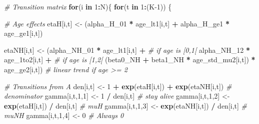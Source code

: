 \documentclass[
  12pt,
]{krantz}
\newenvironment{Shaded}{\begin{snugshade}}{\end{snugshade}}
\newcommand{\CommentTok}[1]{\textcolor[rgb]{0.56,0.35,0.01}{\textit{#1}}}
\newcommand{\ControlFlowTok}[1]{\textcolor[rgb]{0.13,0.29,0.53}{\textbf{#1}}}
\newcommand{\DecValTok}[1]{\textcolor[rgb]{0.00,0.00,0.81}{#1}}
\newcommand{\FunctionTok}[1]{\textcolor[rgb]{0.13,0.29,0.53}{\textbf{#1}}}
\newcommand{\NormalTok}[1]{#1}
\newcommand{\OtherTok}[1]{\textcolor[rgb]{0.56,0.35,0.01}{#1}}
\newcommand{\SpecialCharTok}[1]{\textcolor[rgb]{0.81,0.36,0.00}{\textbf{#1}}}
\begin{document}
\begin{Shaded}
\begin{Highlighting}[]
\CommentTok{\# Transition matrix}
  \ControlFlowTok{for}\NormalTok{(i }\ControlFlowTok{in} \DecValTok{1}\SpecialCharTok{:}\NormalTok{N)\{}
    \ControlFlowTok{for}\NormalTok{(t }\ControlFlowTok{in} \DecValTok{1}\SpecialCharTok{:}\NormalTok{(K}\DecValTok{{-}1}\NormalTok{)) \{}
      
      \CommentTok{\# Age effects}
\NormalTok{      etaH[i,t] }\OtherTok{\textless{}{-}}\NormalTok{ (alpha\_H\_01 }\SpecialCharTok{*}\NormalTok{ age\_lt1[i,t] }\SpecialCharTok{+}\NormalTok{ alpha\_H\_ge1 }\SpecialCharTok{*}\NormalTok{ age\_ge1[i,t])}
      
\NormalTok{      etaNH[i,t] }\OtherTok{\textless{}{-}}\NormalTok{ (alpha\_NH\_01 }\SpecialCharTok{*}\NormalTok{ age\_lt1[i,t] }\SpecialCharTok{+}                               \CommentTok{\# if age is [0,1[}
\NormalTok{                       alpha\_NH\_12 }\SpecialCharTok{*}\NormalTok{ age\_1to2[i,t] }\SpecialCharTok{+}                            \CommentTok{\# if age is [1,2[}
\NormalTok{                       (beta0\_NH }\SpecialCharTok{+}\NormalTok{ beta1\_NH }\SpecialCharTok{*}\NormalTok{ age\_std\_mu2[i,t]) }\SpecialCharTok{*}\NormalTok{ age\_ge2[i,t]) }\CommentTok{\# linear trend if age \textgreater{}= 2}
      
      \CommentTok{\# Transitions from A}
\NormalTok{      den[i,t] }\OtherTok{\textless{}{-}} \DecValTok{1} \SpecialCharTok{+} \FunctionTok{exp}\NormalTok{(etaH[i,t]) }\SpecialCharTok{+} \FunctionTok{exp}\NormalTok{(etaNH[i,t])  }\CommentTok{\# denominator}
\NormalTok{      gamma[i,t,}\DecValTok{1}\NormalTok{,}\DecValTok{1}\NormalTok{] }\OtherTok{\textless{}{-}} \DecValTok{1} \SpecialCharTok{/}\NormalTok{ den[i,t]  }\CommentTok{\# stay alive}
\NormalTok{      gamma[i,t,}\DecValTok{1}\NormalTok{,}\DecValTok{2}\NormalTok{] }\OtherTok{\textless{}{-}} \FunctionTok{exp}\NormalTok{(etaH[i,t]) }\SpecialCharTok{/}\NormalTok{ den[i,t]   }\CommentTok{\# muH}
\NormalTok{      gamma[i,t,}\DecValTok{1}\NormalTok{,}\DecValTok{3}\NormalTok{] }\OtherTok{\textless{}{-}} \FunctionTok{exp}\NormalTok{(etaNH[i,t]) }\SpecialCharTok{/}\NormalTok{ den[i,t]  }\CommentTok{\# muNH}
\NormalTok{      gamma[i,t,}\DecValTok{1}\NormalTok{,}\DecValTok{4}\NormalTok{] }\OtherTok{\textless{}{-}} \DecValTok{0}  \CommentTok{\# Always 0}
      

\end{Highlighting}
\end{Shaded}
\end{document}

